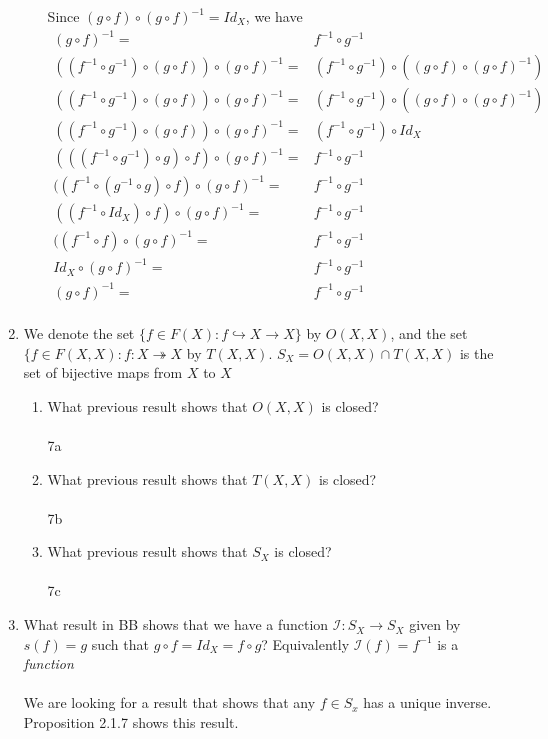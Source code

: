 \documentclass[11pt]{article}
\begin{document}
\begin{enumerate}
\begin{enumerate}
Since $(g \circ f) \circ (g \circ f)^{-1} = Id_X$, we have\\
\begin{align*}
(g \circ f)^{-1} =& f^{-1} \circ g^{-1}\\
((f^{-1} \circ g^{-1}) \circ (g \circ f)) \circ (g \circ f)^{-1} =& (f^{-1} \circ g^{-1}) \circ ((g \circ f) \circ (g \circ f)^{-1})\\
((f^{-1} \circ g^{-1}) \circ (g \circ f)) \circ (g \circ f)^{-1} =& (f^{-1} \circ g^{-1}) \circ ((g \circ f) \circ (g \circ f)^{-1})\\
((f^{-1} \circ g^{-1}) \circ (g \circ f)) \circ (g \circ f)^{-1} =& (f^{-1} \circ g^{-1}) \circ Id_X\\
(((f^{-1} \circ g^{-1}) \circ g) \circ f) \circ (g \circ f)^{-1} =& f^{-1} \circ g^{-1}\\
((f^{-1} \circ (g^{-1} \circ g) \circ f) \circ (g \circ f)^{-1} =& f^{-1} \circ g^{-1}\\
((f^{-1} \circ Id_X) \circ f) \circ (g \circ f)^{-1} =& f^{-1} \circ g^{-1}\\
((f^{-1} \circ f) \circ (g \circ f)^{-1} =& f^{-1} \circ g^{-1}\\
Id_X \circ (g \circ f)^{-1} =& f^{-1} \circ g^{-1}\\
(g \circ f)^{-1} =& f^{-1} \circ g^{-1}\\
\end{align*}
\end{enumerate}


\newpage
\item We denote the set $\{f \in F(X) : f \hookrightarrow X \to X\}$ by $O(X, X)$, and the set $\{f \in F(X, X) : f : X \twoheadrightarrow X$ by $T(X, X)$.  $S_X = O(X,X) \cap T(X,X)$ is the set of bijective maps from $X$ to $X$
\begin{enumerate}
\item What previous result shows that $O(X, X)$ is closed?\\\\
7a
\item What previous result shows that $T(X, X)$ is closed?\\\\
7b
\item What previous result shows that $S_X$ is closed?\\\\
7c
\end{enumerate}

\newpage
\item What result in BB shows that we have a function $\mathcal{I} : S_X \to S_X$ given by $s(f) = g$ such that $g \circ f = Id_X = f \circ g$? Equivalently $\mathcal{I}(f) = f^{-1}$ is a \emph{function}\\\\
We are looking for a result that shows that any $f \in S_x$ has a unique inverse.  Proposition 2.1.7 shows this result.


\end{enumerate}
\end{document}
